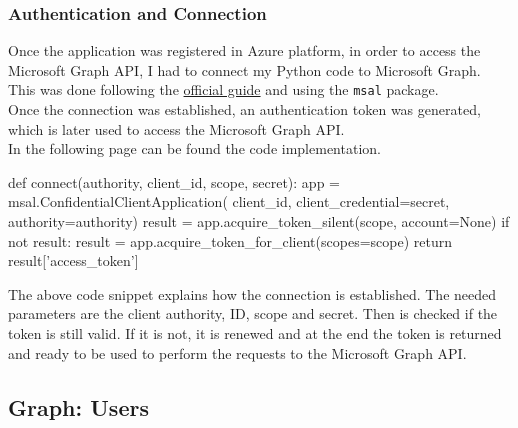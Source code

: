 \documentclass[12pt, a4paper, oneside]{article}
\begin{document}
\subsubsection{Authentication and Connection}
Once the application was registered in Azure platform, in order to access the Microsoft Graph API, I had to connect my Python code to Microsoft Graph. This was done following the 
\href{https://github.com/Azure-Samples/ms-identity-python-daemon/tree/master/1-Call-MsGraph-WithSecret}{official guide} and using the \texttt{msal} package.\\
Once the connection was established, an authentication token was generated, which is later used to access the Microsoft Graph API.\\
In the following page can be found the code implementation.
\newpage
\begin{python}
  def connect(authority, client_id, scope, secret):
      app = msal.ConfidentialClientApplication(
            client_id, client_credential=secret, 
            authority=authority)
      result = app.acquire_token_silent(scope, account=None)
      if not result:
          result = app.acquire_token_for_client(scopes=scope)
      return result['access_token']
\end{python}
The above code snippet explains how the connection is established. The needed parameters are the client authority, ID, scope and secret. Then is checked if the token is still valid. If it is not, it is renewed
and at the end the token is returned and ready to be used to perform the requests to the Microsoft Graph API.

\subsection{Graph: Users}
\end{document}
